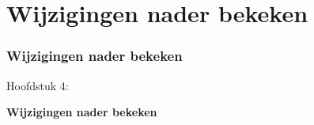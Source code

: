 %

\section{Wijzigingen nader bekeken}
\begin{frame}[fragile]
	\frametitle{Wijzigingen nader bekeken}

	\begin{center}\huge{Hoofdstuk 4:}\end{center}
	\begin{center}\huge{\color{typo3darkgrey}\textbf{Wijzigingen nader bekeken}}\end{center}

\end{frame}



